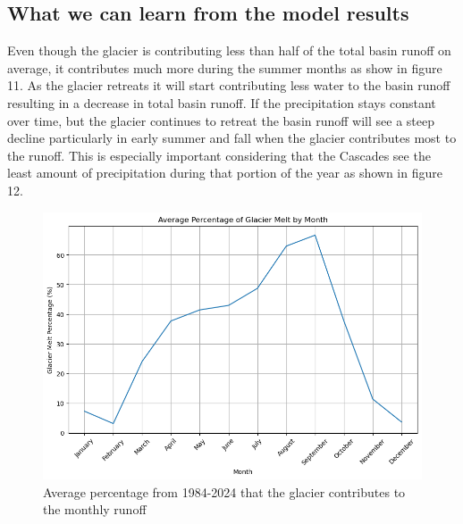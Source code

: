 \documentclass{article}
\begin{document}
\subsection{What we can learn from the model results}
Even though the glacier is contributing less than half of the total basin runoff on average, it contributes much more during the summer 
months as show in figure 11. As the glacier retreats it will start contributing less water to the basin runoff resulting in a decrease in total 
basin runoff. If the precipitation stays constant over time, but the glacier continues to retreat the basin runoff will see a steep decline 
particularly in early summer and fall when the glacier contributes most to the runoff. This is especially important considering that the 
Cascades see the least amount of precipitation during that portion of the year as shown in figure 12.
\begin{figure}
    \centering
    \includegraphics[width=\textwidth]{Plots/percent_glac_melt_month.png}
    \caption{Average percentage from 1984-2024 that the glacier contributes to the monthly runoff}
    \label{fig:percent_glacier_runoff}
\end{figure}
\FloatBarrier\
\end{document}
